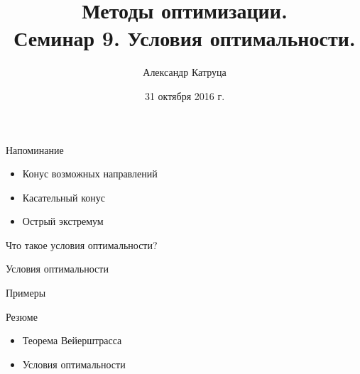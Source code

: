 \documentclass[12pt,russian]{beamer}
\title[Семинар 9]{Методы оптимизации. \\
 Семинар 9. Условия оптимальности.}
\author{Александр Катруца}
\institute{Московский физико-технический институт,\\
Факультет Управления и Прикладной Математики}
\date{31 октября 2016 г.}
\begin{document}
\begin{frame}
\maketitle
\end{frame}

\begin{frame}{Напоминание}
\begin{itemize}
\item Конус возможных направлений
\item Касательный конус
\item Острый экстремум
\end{itemize}
\end{frame}

\begin{frame}{Что такое условия оптимальности?}

\end{frame}

\begin{frame}{Условия оптимальности}

\end{frame}

\begin{frame}{Примеры}

\end{frame}

\begin{frame}{Резюме}
\begin{itemize}
\item Теорема Вейерштрасса
\item Условия оптимальности
\end{itemize}
\end{frame}
\end{document}

